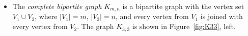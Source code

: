 

\setcounter{section}{1}
\setcounter{subsection}{3}
\setcounter{dfn}{2}


\begin{itemize}
\item
The \emph{complete bipartite graph} $K_{m,n}$ is a bipartite graph with the vertex set $V_1 \cup V_2$,
where $|V_1| = m$, $|V_2| = n$, and every vertex from $V_1$ is joined with every vertex from $V_2$.
The graph $K_{3,3}$ is shown in Figure~\ref{fig:K33}, left.
\end{itemize}



